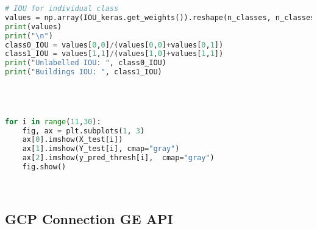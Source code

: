 \begin{lstlisting}[language=Python]
# IOU for individual class
values = np.array(IOU_keras.get_weights()).reshape(n_classes, n_classes)
print(values)
print("\n")
class0_IOU = values[0,0]/(values[0,0]+values[0,1])
class1_IOU = values[1,1]/(values[1,0]+values[1,1])
print("Unlabelled IOU: ", class0_IOU)
print("Buildings IOU: ", class1_IOU)




for i in range(11,30):
    fig, ax = plt.subplots(1, 3)
    ax[0].imshow(X_test[i])
    ax[1].imshow(Y_test[i], cmap="gray")
    ax[2].imshow(y_pred_thresh[i],  cmap="gray")
    fig.show()




\end{lstlisting}


\subsection{GCP Connection GE API}
